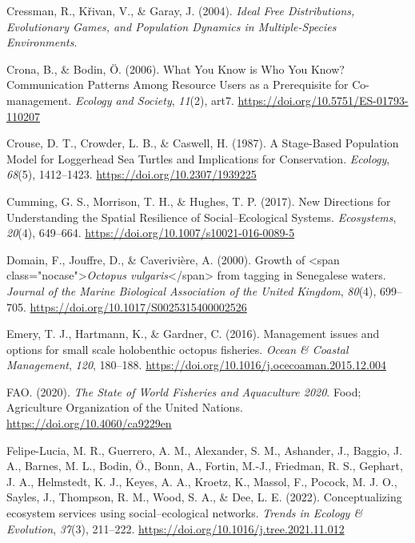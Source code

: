 \documentclass[
]{article}
\newlength{\cslhangindent}
\newlength{\cslentryspacingunit} %
\newenvironment{CSLReferences}[2] %
 {%
  \setlength{\parindent}{0pt}
  \ifodd #1
  \let\oldpar\par
  \def\par{\hangindent=\cslhangindent\oldpar}
  \fi
  \setlength{\parskip}{#2\cslentryspacingunit}
 }%
 {}
\begin{document}
\begin{CSLReferences}{1}{2}
\leavevmode{}%
Cressman, R., Křivan, V., \& Garay, J. (2004). \emph{Ideal {Free} {Distributions}, {Evolutionary} {Games}, and {Population} {Dynamics} in {Multiple}-{Species} {Environments}}.

\leavevmode{}%
Crona, B., \& Bodin, Ö. (2006). What {You} {Know} is {Who} {You} {Know}? {Communication} {Patterns} {Among} {Resource} {Users} as a {Prerequisite} for {Co}-management. \emph{Ecology and Society}, \emph{11}(2), art7. \url{https://doi.org/10.5751/ES-01793-110207}

\leavevmode{}%
Crouse, D. T., Crowder, L. B., \& Caswell, H. (1987). A {Stage}-{Based} {Population} {Model} for {Loggerhead} {Sea} {Turtles} and {Implications} for {Conservation}. \emph{Ecology}, \emph{68}(5), 1412--1423. \url{https://doi.org/10.2307/1939225}

\leavevmode{}%
Cumming, G. S., Morrison, T. H., \& Hughes, T. P. (2017). New {Directions} for {Understanding} the {Spatial} {Resilience} of {Social}--{Ecological} {Systems}. \emph{Ecosystems}, \emph{20}(4), 649--664. \url{https://doi.org/10.1007/s10021-016-0089-5}

\leavevmode{}%
Domain, F., Jouffre, D., \& Caverivière, A. (2000). Growth of {\textless{}}span class="nocase"{\textgreater{}}\emph{{Octopus} vulgaris}{\textless{}}/span{\textgreater{}} from tagging in {Senegalese} waters. \emph{Journal of the Marine Biological Association of the United Kingdom}, \emph{80}(4), 699--705. \url{https://doi.org/10.1017/S0025315400002526}

\leavevmode{}%
Emery, T. J., Hartmann, K., \& Gardner, C. (2016). Management issues and options for small scale holobenthic octopus fisheries. \emph{Ocean \& Coastal Management}, \emph{120}, 180--188. \url{https://doi.org/10.1016/j.ocecoaman.2015.12.004}

\leavevmode{}%
FAO. (2020). \emph{The {State} of {World} {Fisheries} and {Aquaculture} 2020}. Food; Agriculture Organization of the United Nations. \url{https://doi.org/10.4060/ca9229en}

\leavevmode{}%
Felipe-Lucia, M. R., Guerrero, A. M., Alexander, S. M., Ashander, J., Baggio, J. A., Barnes, M. L., Bodin, Ö., Bonn, A., Fortin, M.-J., Friedman, R. S., Gephart, J. A., Helmstedt, K. J., Keyes, A. A., Kroetz, K., Massol, F., Pocock, M. J. O., Sayles, J., Thompson, R. M., Wood, S. A., \& Dee, L. E. (2022). Conceptualizing ecosystem services using social--ecological networks. \emph{Trends in Ecology \& Evolution}, \emph{37}(3), 211--222. \url{https://doi.org/10.1016/j.tree.2021.11.012}


\end{CSLReferences}
\end{document}
